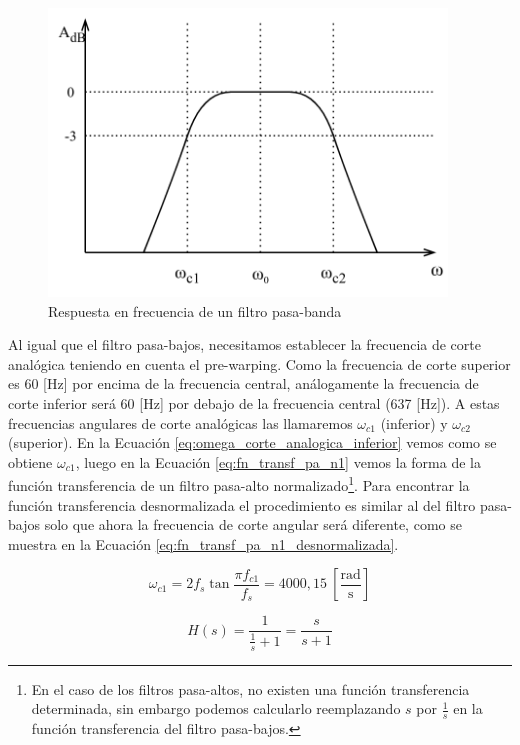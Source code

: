 \begin{figure}[ht!]
  \centering
  \includegraphics[width=300pt]{images/diagramas-bode-pasa-banda.png}
  \caption{Respuesta en frecuencia de un filtro pasa-banda}
  \label{fig:diagrama_bode_pasa_banda}
\end{figure}

Al igual que el filtro pasa-bajos, necesitamos establecer la frecuencia de corte analógica teniendo en cuenta el pre-warping. Como la frecuencia de corte superior es 60 [Hz] por encima de la frecuencia central, análogamente la frecuencia de corte inferior será 60 [Hz] por debajo de la frecuencia central (637 [Hz]). A estas frecuencias angulares de corte analógicas las llamaremos $\omega_{c1}$ (inferior) y $\omega_{c2}$ (superior). En la Ecuación \ref{eq:omega_corte_analogica_inferior} vemos como se obtiene $\omega_{c1}$, luego en la Ecuación \ref{eq:fn_transf_pa_n1} vemos la forma de la función transferencia de un filtro pasa-alto normalizado\footnote{En el caso de los filtros pasa-altos, no existen una función transferencia determinada, sin embargo podemos calcularlo reemplazando $s$ por $\frac{1}{s}$ en la función transferencia del filtro pasa-bajos.}. Para encontrar la función transferencia desnormalizada el procedimiento es similar al del filtro pasa-bajos solo que ahora la frecuencia de corte angular será diferente, como se muestra en la Ecuación \ref{eq:fn_transf_pa_n1_desnormalizada}.

\begin{equation}
  \omega_{c1} = 2 f_s \tan \frac{\pi f_{c1}}{f_s} = 4000,15\ \mathrm{\left[\frac{rad}{s}\right]}
  \label{eq:omega_corte_analogica_inferior}
\end{equation}

\begin{equation}
  H(s) = \frac{1}{\frac{1}{s}+1} = \frac{s}{s+1}
  \label{eq:fn_transf_pa_n1}
\end{equation}

